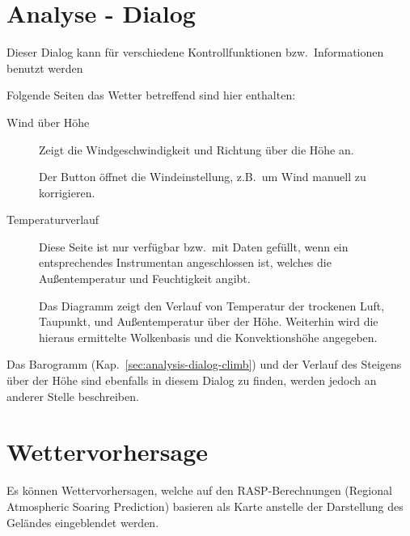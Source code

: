 \section{Analyse - Dialog}
Dieser Dialog kann für verschiedene Kontrollfunktionen bzw.\ Informationen benutzt werden 



Folgende Seiten das Wetter betreffend sind hier enthalten:
\begin{description}
\item[Wind über Höhe]
Zeigt die Windgeschwindigkeit und Richtung über die Höhe an.

Der Button  öffnet die Windeinstellung, z.B.\ um Wind manuell zu korrigieren.



\item[Temperaturverlauf]
 Diese Seite ist nur verfügbar bzw.\ mit Daten gefüllt, wenn ein entsprechendes Instrumentan  \xc angeschlossen ist, welches die Außentemperatur und Feuchtigkeit angibt.

Das Diagramm zeigt den Verlauf von Temperatur der trockenen Luft, Taupunkt, und Außentemperatur
über der Höhe. Weiterhin wird die hieraus ermittelte Wolkenbasis und die Konvektionshöhe  angegeben.



\end{description}
Das Barogramm (Kap.~\ref{sec:analysis-dialog-climb}) und der Verlauf des Steigens über der Höhe sind
ebenfalls in diesem Dialog zu finden, werden jedoch an anderer Stelle beschreiben.

\section{Wettervorhersage}
Es können Wettervorhersagen, welche auf den RASP-Berechnungen (Regional Atmospheric
Soaring Prediction) basieren als Karte anstelle der Darstellung des Geländes eingeblendet werden.

